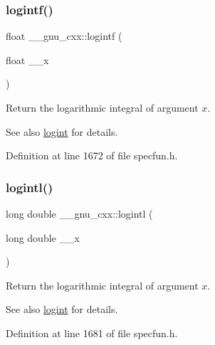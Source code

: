 \subsubsection{\texorpdfstring{logintf()}{logintf()}}
{\footnotesize\ttfamily float \+\_\+\+\_\+gnu\+\_\+cxx\+::logintf (\begin{DoxyParamCaption}\item[{float}]{\+\_\+\+\_\+x }\end{DoxyParamCaption})\hspace{0.3cm}{\ttfamily [inline]}}

Return the logarithmic integral of argument $ x $.

\begin{DoxySeeAlso}{See also}
\hyperlink{group__gnu__math__spec__func_ga1c0fe0f4cb72041f24db82dc7e47df11}{logint} for details. 
\end{DoxySeeAlso}


Definition at line 1672 of file specfun.\+h.

\mbox{\label{group__gnu__math__spec__func_gab17f5cadc8f77ba2666d0d5ecc78de5d}} 
\subsubsection{\texorpdfstring{logintl()}{logintl()}}
{\footnotesize\ttfamily long double \+\_\+\+\_\+gnu\+\_\+cxx\+::logintl (\begin{DoxyParamCaption}\item[{long double}]{\+\_\+\+\_\+x }\end{DoxyParamCaption})\hspace{0.3cm}{\ttfamily [inline]}}

Return the logarithmic integral of argument $ x $.

\begin{DoxySeeAlso}{See also}
\hyperlink{group__gnu__math__spec__func_ga1c0fe0f4cb72041f24db82dc7e47df11}{logint} for details. 
\end{DoxySeeAlso}


Definition at line 1681 of file specfun.\+h.

\mbox{\label{group__gnu__math__spec__func_ga5a5d9c5e7ab822f84578415be8609f49}} 
